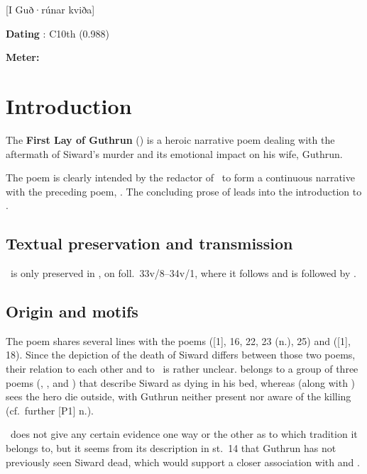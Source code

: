 [I Guð·rúnar kviða]

\begin{flushright}%
\textbf{Dating} \parencite{Sapp2022}: C10th (0.988)

\textbf{Meter:} \Fornyrdislag%
\end{flushright}

\section{Introduction}

The \textbf{First Lay of Guthrun} (\GudrunOne) is a heroic narrative poem dealing with the aftermath of Siward’s murder and its emotional impact on his wife, Guthrun.

The poem is clearly intended by the redactor of \Regius\ to form a continuous narrative with the preceding poem, .  The concluding prose of  leads into the introduction to \GudrunOne.

\subsection{Textual preservation and transmission}

\GudrunOne\ is only preserved in \Regius, on foll.~33v/8--34v/1, where it follows  and is followed by .

\subsection{Origin and motifs}

The poem shares several lines with the poems  ([1], 16, 22, 23 (n.), 25) and  ([1], 18).  Since the depiction of the death of Siward differs between those two poems, their relation to each other and to \GudrunOne\ is rather unclear.   belongs to a group of three poems (, , and ) that describe Siward as dying in his bed, whereas  (along with ) sees the hero die outside, with Guthrun neither present nor aware of the killing (cf.~further [P1] n.).

\GudrunOne\ does not give any certain evidence one way or the other as to which tradition it belongs to, but it seems from its description in st.~14 that Guthrun has not previously seen Siward dead, which would support a closer association with  and .

